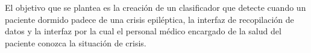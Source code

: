 
El objetivo que se plantea es la creación de un clasificador que detecte cuando un paciente dormido padece de una crisis epiléptica, la interfaz de recopilación de datos y la interfaz por la cual el personal médico encargado de la salud del paciente conozca la situación de crisis.
